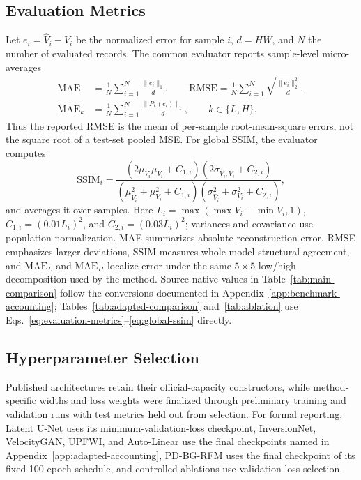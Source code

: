 \documentclass[letterpaper]{article}
\begin{document}
\subsection{Evaluation Metrics}
Let $e_i=\hat V_i-V_i$ be the normalized error for sample $i$, $d=HW$, and $N$ the number of evaluated records. The common evaluator reports sample-level micro-averages
\begin{align}
\mathrm{MAE}
&=\frac{1}{N}\sum_{i=1}^{N}\frac{\|e_i\|_1}{d},\qquad
\mathrm{RMSE}
=\frac{1}{N}\sum_{i=1}^{N}\sqrt{\frac{\|e_i\|_2^2}{d}},\nonumber\\
\mathrm{MAE}_{k}
&=\frac{1}{N}\sum_{i=1}^{N}\frac{\|P_k(e_i)\|_1}{d},
\qquad k\in\{L,H\}.
\label{eq:evaluation-metrics}
\end{align}
Thus the reported RMSE is the mean of per-sample root-mean-square errors, not the square root of a test-set pooled MSE. For global SSIM, the evaluator computes
\begin{equation}
\mathrm{SSIM}_i=
\frac{(2\mu_{\hat V_i}\mu_{V_i}+C_{1,i})(2\sigma_{\hat V_i,V_i}+C_{2,i})}
{(\mu_{\hat V_i}^2+\mu_{V_i}^2+C_{1,i})(\sigma_{\hat V_i}^2+\sigma_{V_i}^2+C_{2,i})},
\label{eq:global-ssim}
\end{equation}
and averages it over samples. Here $L_i=\max(\max V_i-\min V_i,1)$, $C_{1,i}=(0.01L_i)^2$, and $C_{2,i}=(0.03L_i)^2$; variances and covariance use population normalization. MAE summarizes absolute reconstruction error, RMSE emphasizes larger deviations, SSIM measures whole-model structural agreement, and $\mathrm{MAE}_L$ and $\mathrm{MAE}_H$ localize error under the same $5\times5$ low/high decomposition used by the method. Source-native values in Table~\ref{tab:main-comparison} follow the conversions documented in Appendix~\ref{app:benchmark-accounting}; Tables~\ref{tab:adapted-comparison} and~\ref{tab:ablation} use Eqs.~\ref{eq:evaluation-metrics}--\ref{eq:global-ssim} directly.

\subsection{Hyperparameter Selection}
Published architectures retain their official-capacity constructors, while method-specific widths and loss weights were finalized through preliminary training and validation runs with test metrics held out from selection. For formal reporting, Latent U-Net uses its minimum-validation-loss checkpoint, InversionNet, VelocityGAN, UPFWI, and Auto-Linear use the final checkpoints named in Appendix~\ref{app:adapted-accounting}, PD-BG-RFM uses the final checkpoint of its fixed 100-epoch schedule, and controlled ablations use validation-loss selection.
\end{document}
